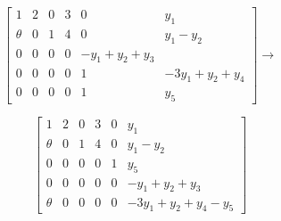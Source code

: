 \[\begin{bmatrix}1&2&0&3&0&y_{1}\\ \mathfrak{\theta}&0&1&4&0&y_{1}-y_{2}\\ 0&0&0&0&-y_{1}+y_{2}+y_{3}\\ 0&0&0&0&1&-3y_{1}+y_{2}+y_{4}\\ 0&0&0&0&1&y_{5}\end{bmatrix}\longrightarrow\]

\[\begin{bmatrix}1&2&0&3&0&y_{1}\\ \mathfrak{\theta}&0&1&4&0&y_{1}-y_{2}\\ 0&0&0&0&1&y_{5}\\ 0&0&0&0&0&-y_{1}+y_{2}+y_{3}\\ \mathfrak{\theta}&0&0&0&0&-3y_{1}+y_{2}+y_{4}-y_{5}\end{bmatrix}\]